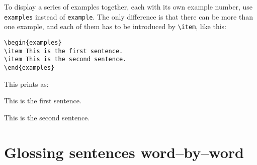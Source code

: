 \documentclass{article}
\begin{document}
To display a series of examples together, each with its own example 
number, use \texttt{examples} instead of \texttt{example}.  The only 
difference is that there can be more than one example, and each of them 
has to be introduced by \verb"\item", like this:
\begin{verbatim}
\begin{examples}
\item This is the first sentence.
\item This is the second sentence.
\end{examples}
\end{verbatim}
This prints as:
\begin{examples}
\item This is the first sentence.
\item This is the second sentence.
\end{examples}


\section{Glossing sentences word--by--word}
\end{document}
